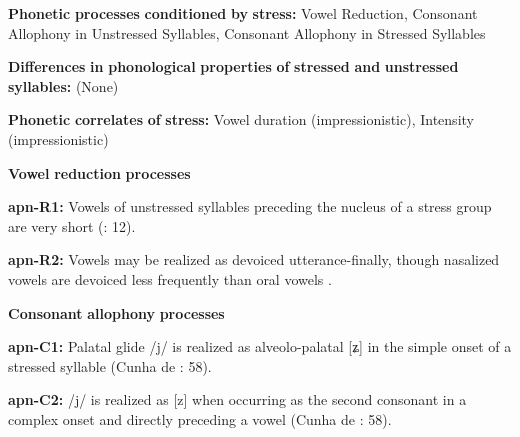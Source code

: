 \documentclass[output=paper]{langsci/langscibook}
\begin{document}
\begin{styleBody}
\textbf{Phonetic} \textbf{processes} \textbf{conditioned} \textbf{by} \textbf{stress:} Vowel Reduction, Consonant Allophony in Unstressed Syllables, Consonant Allophony in Stressed Syllables
\end{styleBody}

\begin{styleBody}
\textbf{Differences} \textbf{in} \textbf{phonological} \textbf{properties} \textbf{of} \textbf{stressed} \textbf{and} \textbf{unstressed} \textbf{syllables:} (None)
\end{styleBody}

\begin{styleBody}
\textbf{Phonetic} \textbf{correlates} \textbf{of} \textbf{stress:} Vowel duration (impressionistic), Intensity (impressionistic)
\end{styleBody}

\begin{styleBody}
\textbf{Vowel} \textbf{reduction} \textbf{processes}
\end{styleBody}

\begin{styleBody}
\textbf{apn-R1:} Vowels of unstressed syllables preceding the nucleus of a stress group are very short (\citealt{BurgessHam1968}: 12).
\end{styleBody}

\begin{styleBody}
\textbf{apn-R2:} Vowels may be realized as devoiced utterance-finally, though nasalized vowels are devoiced less frequently than oral vowels \citep[7]{Ham2009}.
\end{styleBody}

\begin{styleBody}
\textbf{Consonant} \textbf{allophony} \textbf{processes}
\end{styleBody}

\begin{styleBody}
\textbf{apn-C1:} Palatal glide /j/ is realized as alveolo-palatal [ʑ] in the simple onset of a stressed syllable (Cunha de \citealt{Oliveira2005}: 58).
\end{styleBody}

\begin{styleBody}
\textbf{apn-C2:} /j/ is realized as [z] when occurring as the second consonant in a complex onset and directly preceding a vowel (Cunha de \citealt{Oliveira2005}: 58).
\end{styleBody}
\end{document}
